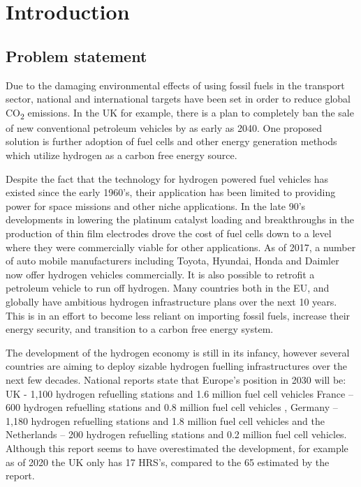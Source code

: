 \chapter{Introduction}
\section{Problem statement}
Due to the damaging environmental effects of using fossil fuels in the transport sector, national and 
international targets have been set in order to reduce global CO\textsubscript{2} emissions.
In the UK for example, there is a plan to completely ban the sale of new conventional petroleum vehicles 
by as early as 2040. 
\cite{DepartmentforEnvironment2017} 
One proposed solution is further adoption of fuel cells and other energy generation methods which utilize
hydrogen as a carbon free energy source. 

Despite the fact that the technology for hydrogen powered fuel vehicles has existed since the early 1960’s, their application has been limited to providing power for space missions and other niche applications. In the late 90’s developments in lowering the platinum catalyst loading and breakthroughs in the production of thin film electrodes drove the cost of fuel cells down to a level where they were commercially viable for other applications. As of 2017, a number of auto mobile manufacturers including Toyota,\cite{Toyota2015} Hyundai, \cite{Hyundai2015} Honda \cite{Honda} and Daimler \cite{Mohrdieck2014} now offer hydrogen vehicles commercially. It is also possible to retrofit a petroleum vehicle to run off hydrogen.\cite{FCell2016} Many countries both in the EU, and globally have ambitious hydrogen infrastructure plans over the next 10 years. This is in an effort to become less reliant on importing fossil fuels, increase their energy security, and transition to a carbon free energy system.

The development of the hydrogen economy is still in its infancy,  however several countries are aiming to deploy sizable hydrogen fuelling infrastructures over the next few decades. National reports state that Europe’s position in 2030 will be: UK - 1,100 hydrogen refuelling stations and 1.6 million fuel cell vehicles \cite{UKH2Mobility2013} France – 600 hydrogen refuelling stations and 0.8 million fuel cell vehicles \cite{Summerton2015}, Germany – 1,180 hydrogen refuelling stations \cite{Hayter2014} and 1.8 million fuel cell vehicles  and the Netherlands – 200 hydrogen refuelling stations and 0.2 million fuel cell vehicles. \cite{Hayter2014} Although this report seems to have overestimated the development, for example as of 2020 the UK only has 17 HRS's, compared to the 65 estimated by the report.  

